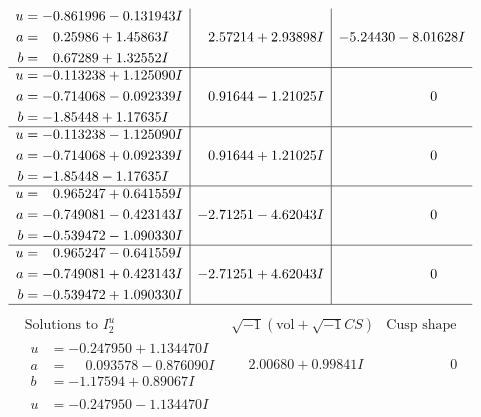 \documentclass[1p]{elsarticle_modified}
\theoremstyle{definition}
\newcommand{\I}{\sqrt{-1}}
\begin{document}
$$\begin{array}{c|c|c}
\begin{aligned}
u &= -0.861996 - 0.131943 I \\
a &= \phantom{-}0.25986 + 1.45863 I \\
b &= \phantom{-}0.67289 + 1.32552 I\end{aligned}
 & \phantom{-}2.57214 + 2.93898 I & -5.24430 - 8.01628 I \\ \hline\begin{aligned}
u &= -0.113238 + 1.125090 I \\
a &= -0.714068 - 0.092339 I \\
b &= -1.85448 + 1.17635 I\end{aligned}
 & \phantom{-}0.91644 - 1.21025 I & \phantom{-0.000000 } 0 \\ \hline\begin{aligned}
u &= -0.113238 - 1.125090 I \\
a &= -0.714068 + 0.092339 I \\
b &= -1.85448 - 1.17635 I\end{aligned}
 & \phantom{-}0.91644 + 1.21025 I & \phantom{-0.000000 } 0 \\ \hline\begin{aligned}
u &= \phantom{-}0.965247 + 0.641559 I \\
a &= -0.749081 - 0.423143 I \\
b &= -0.539472 - 1.090330 I\end{aligned}
 & -2.71251 - 4.62043 I & \phantom{-0.000000 } 0 \\ \hline\begin{aligned}
u &= \phantom{-}0.965247 - 0.641559 I \\
a &= -0.749081 + 0.423143 I \\
b &= -0.539472 + 1.090330 I\end{aligned}
 & -2.71251 + 4.62043 I & \phantom{-0.000000 } 0\\
 \hline 
 \end{array}$$\newpage$$\begin{array}{c|c|c}  
\text{Solutions to }I^u_{2}& \I (\text{vol} + \sqrt{-1}CS) & \text{Cusp shape}\\
 \hline 
\begin{aligned}
u &= -0.247950 + 1.134470 I \\
a &= \phantom{-}0.093578 - 0.876090 I \\
b &= -1.17594 + 0.89067 I\end{aligned}
 & \phantom{-}2.00680 + 0.99841 I & \phantom{-0.000000 } 0 \\ \hline\begin{aligned}
u &= -0.247950 - 1.134470 I \\

\end{aligned}
\end{array}$$
\end{document}
